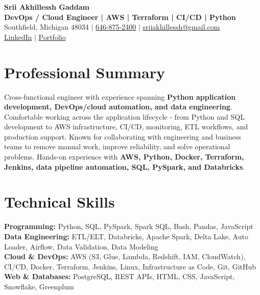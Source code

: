 \documentclass[letterpaper,10pt]{article}
\begin{document}
\fontsize{9.35pt}{10.45pt}\selectfont

\begin{center}
    {\LARGE \textbf{Srii Akhillessh Gaddam}} \\[-1pt]
    \textbf{DevOps / Cloud Engineer | AWS | Terraform | CI/CD | Python} \\[2pt]
    Southfield, Michigan 48034 $|$
    \href{tel:6468752400}{646-875-2400} $|$
    \href{mailto:sriiakhillessh@gmail.com}{sriiakhillessh@gmail.com} \\[1pt]
    \href{https://www.linkedin.com/in/srii-akhiilessh-gaddam-b48668191/}{LinkedIn} $|$
    \href{https://sriiakhillesshg.github.io/portfolio/}{Portfolio}
\end{center}
\vspace{-8pt}

\section{Professional Summary}
\small{Cross-functional engineer with experience spanning \textbf{Python application development, DevOps/cloud automation, and data engineering}. Comfortable working across the application lifecycle - from Python and SQL development to AWS infrastructure, CI/CD, monitoring, ETL workflows, and production support. Known for collaborating with engineering and business teams to remove manual work, improve reliability, and solve operational problems. Hands-on experience with \textbf{AWS, Python, Docker, Terraform, Jenkins, data pipeline automation, SQL, PySpark, and Databricks}.}

\section{Technical Skills}
\small{
\textbf{Programming:} Python, SQL, PySpark, Spark SQL, Bash, Pandas, JavaScript \\
\textbf{Data Engineering:} ETL/ELT, Databricks, Apache Spark, Delta Lake, Auto Loader, Airflow, Data Validation, Data Modeling \\
\textbf{Cloud \& DevOps:} AWS (S3, Glue, Lambda, Redshift, IAM, CloudWatch), CI/CD, Docker, Terraform, Jenkins, Linux, Infrastructure as Code, Git, GitHub \\
\textbf{Web \& Databases:} PostgreSQL, REST APIs, HTML, CSS, JavaScript, Snowflake, Greenplum
}
\end{document}
